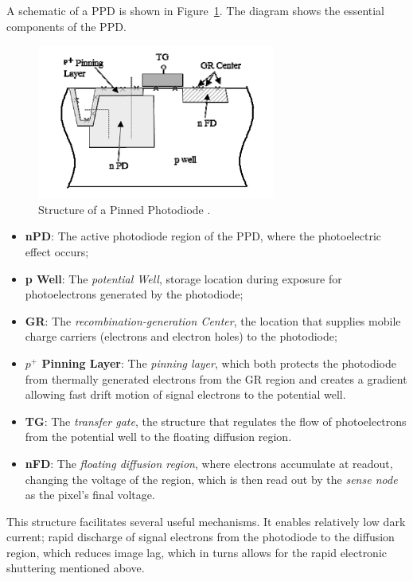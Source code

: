 \documentclass[10pt]{article}
\begin{document}
A schematic of a PPD is shown in Figure~\ref{fig:PPDStructure}. The diagram shows the essential components of the PPD.

\begin{figure}[!t]
    \centering
        \includegraphics[height=2.0in]{PPD Structure.png}
    \caption{Structure of a Pinned Photodiode \cite{teranishi15}.}
    \label{fig:PPDStructure}
\end{figure} 

\begin{itemize}[noitemsep]
\item \textbf{nPD}: The active photodiode region of the PPD, where the photoelectric effect occurs;
\item \textbf{p Well}: The \emph{potential Well}, storage location during exposure for photoelectrons generated by the photodiode;
\item \textbf{GR}: The \emph{recombination-generation Center}, the location that supplies mobile charge carriers (electrons and electron holes) to the photodiode;
\item \textbf{\boldmath$p^+$ Pinning Layer}: The \emph{pinning layer}, which both protects the photodiode from thermally generated electrons from the GR region and creates a gradient allowing fast drift motion of signal electrons to the potential well. 
\item \textbf{TG}: The \emph{transfer gate}, the structure that regulates the flow of photoelectrons from the potential well to the floating diffusion region.
\item \textbf{nFD}: The \emph{floating diffusion region}, where electrons accumulate at readout, changing the voltage of the region, which is then read out by the \emph{sense node} as the pixel's final voltage.
\end{itemize}

This structure facilitates several useful mechanisms. It enables relatively low dark current; rapid discharge of signal electrons from the photodiode to the diffusion region, which reduces image lag, which in turns allows for the rapid electronic shuttering mentioned above.
\end{document}
